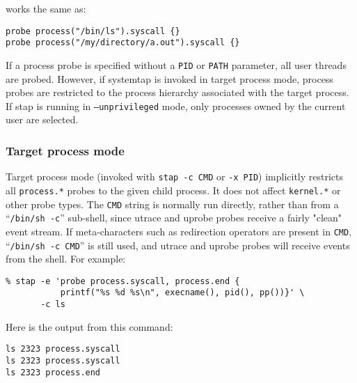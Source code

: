 \documentclass[twoside,english]{article}
\newenvironment{vindent}
{\begin{list}{}{\setlength{\listparindent}{6pt}}
\item[]}
{\end{list}}
\begin{document}
works the same as:
\begin{vindent}
\begin{verbatim}
probe process("/bin/ls").syscall {}
probe process("/my/directory/a.out").syscall {}
\end{verbatim}
\end{vindent}

If a process probe is specified without a \texttt{PID} or
\texttt{PATH} parameter, all user threads are probed. However, if
systemtap is invoked in target process mode, process probes are
restricted to the process hierarchy associated with the target
process. If stap is running in \texttt{--unprivileged} mode, only
processes owned by the current user are selected.

\subsubsection{Target process mode}
\label{sec:targetprocessmode}
Target process mode (invoked with \texttt{stap -c CMD} or \texttt{-x
  PID}) implicitly restricts all \texttt{process.*} probes to the
given child process.  It does not affect \texttt{kernel.*} or other
probe types.  The \texttt{CMD} string is normally run directly, rather
than from a ``\texttt{/bin/sh -c}'' sub-shell, since utrace and uprobe
probes receive a fairly "clean" event stream.  If meta-characters such
as redirection operators are present in \texttt{CMD}, ``\texttt{/bin/sh
  -c CMD}'' is still used, and utrace and uprobe probes will receive
events from the shell. For example:
\begin{vindent}
\begin{verbatim}
% stap -e 'probe process.syscall, process.end {
           printf("%s %d %s\n", execname(), pid(), pp())}' \
       -c ls
\end{verbatim}
\end{vindent}

Here is the output from this command:
\begin{vindent}
\begin{verbatim}
ls 2323 process.syscall
ls 2323 process.syscall
ls 2323 process.end
\end{verbatim}
\end{vindent}
\end{document}
